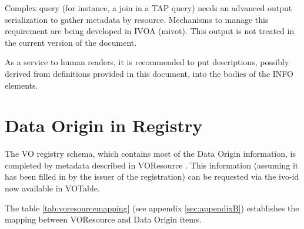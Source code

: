 \documentclass[11pt,a4paper]{ivoa}
\begin{document}
Complex query (for instance, a join in a TAP query) needs an advanced output serialization to gather metadata by resource.
Mechanisms to manage this requirement are being developed in IVOA (mivot).
This output is not treated in the current version of the document.

As a service to human readers, it is recommended to put descriptions, possibly derived from definitions provided in this document, into the bodies of the INFO elements.


\section{Data Origin in Registry}
The VO registry schema, which contains most of the Data Origin information, is completed by metadata described in VOResource \citep{2018ivoa.spec.0625P}. 
This information (assuming it has been filled in by the issuer of the registration) can be requested via the ivo-id now available in VOTable.

The table \ref{tab:voresourcemapping} (see appendix \ref{sec:appendixB}) establishes the mapping between VOResource and Data Origin items.


%



\appendix
\end{document}
